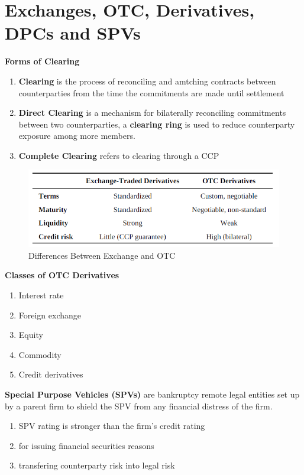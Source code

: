 \documentclass[11pt,fleqn]{book} %
\numberwithin{equation}{section} %
\numberwithin{figure}{section} %
\numberwithin{table}{section} %
\begin{document}
\chapter{Exchanges, OTC, Derivatives, DPCs and SPVs}
 \begin{definition}\textbf{Forms of Clearing}\\
 \begin{enumerate}
     \item \textbf{Clearing} is the process of reconciling and amtching contracts between counterparties from the time the commitments are made until settlement
     \item \textbf{Direct Clearing} is a mechanism for bilaterally reconciling commitments between two counterparties, a \textbf{clearing ring} is used to reduce counterparty exposure among more members.
     \item \textbf{Complete Clearing} refers to clearing through a CCP
 \end{enumerate}
 \end{definition}
 \begin{figure}[h!]
     \centering
     \includegraphics[scale=0.7]{exotc.PNG}
     \caption{Differences Between Exchange and OTC}
 \end{figure}
 \begin{remark}\textbf{Classes of OTC Derivatives}
 \begin{enumerate}
     \item Interest rate
     \item Foreign exchange
     \item Equity
     \item Commodity
     \item Credit derivatives
 \end{enumerate}
 \end{remark}
 \begin{definition}\textbf{Special Purpose Vehicles (SPVs)} are bankruptcy remote legal entities set up by a parent firm to shield the SPV from any financial distress of the firm.
 \begin{enumerate}
     \item SPV rating is stronger than the firm's credit rating
     \item for issuing financial securities reasons
     \item transfering counterparty risk into legal risk
 \end{enumerate}
 \end{definition}
\end{document}
